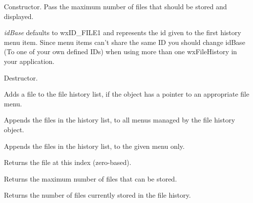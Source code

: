 Constructor. Pass the maximum number of files that should be stored and
displayed.

{\it idBase} defaults to wxID\_FILE1 and represents the id given to the first
history menu item.  Since menu items can't share the same ID you should change
idBase (To one of your own defined IDs) when using more than one wxFileHistory
in your application.

\label{wxfilehistorydtor}


Destructor.

\label{wxfilehistoryaddfiletohistory}


Adds a file to the file history list, if the object has a pointer to an appropriate file menu.

\label{wxfilehistoryaddfilestomenu}


Appends the files in the history list, to all menus managed by the file history object.


Appends the files in the history list, to the given menu only.

\label{wxfilehistorygethistoryfile}


Returns the file at this index (zero-based).

\label{wxfilehistorygetmaxfiles}


Returns the maximum number of files that can be stored.

\label{wxfilehistorygetcount}


Returns the number of files currently stored in the file history.

\label{wxfilehistoryload}



